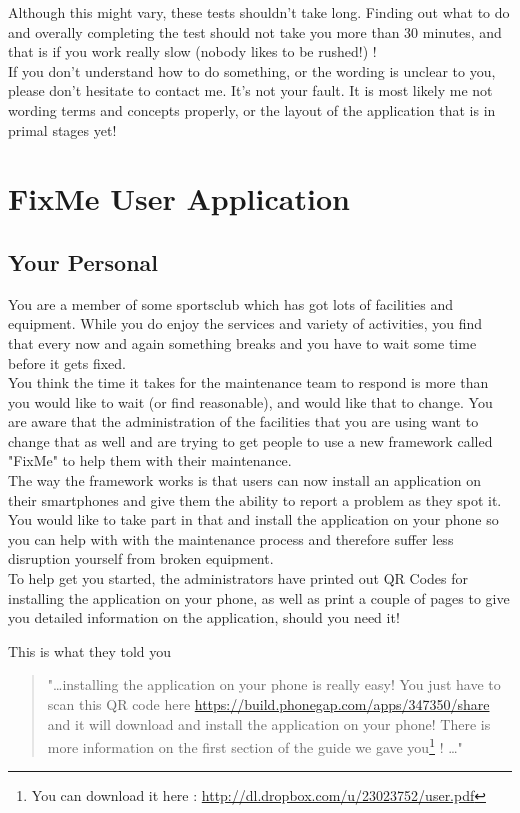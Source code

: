 \documentclass[12pt]{article}
\begin{document}
Although this might vary, these tests shouldn't take long. Finding out what to do and overally completing the test should not take you more than 30 minutes, and that is if you work really slow (nobody likes to be rushed!) !\\

If you don't understand how to do something, or the wording is unclear to you, please don't hesitate to contact me. It's not your fault. It is most likely me not wording terms and concepts properly, or the layout of the application that is in primal stages yet!

\pagebreak
\section{FixMe User Application}
\subsection{Your Personal}

You are a member of some sportsclub which has got lots of facilities and equipment. While you do enjoy the services and variety of activities, you find that every now and again something breaks and you have to wait some time before it gets fixed. \\

You think the time it takes for the maintenance team to respond is more than you would like to wait (or find reasonable), and would like that to change. You are aware that the administration of the facilities that you are using want to change that as well and are trying to get people to use a new framework called "FixMe" to help them with their maintenance.\\

The way the framework works is that users can now install an application on their smartphones and give them the ability to report a problem as they spot it. You would like to take part in that and install the application on your phone so you can help with with the maintenance process and therefore suffer less disruption yourself from broken equipment.\\

To help get you started, the administrators have printed out QR Codes for installing the application on your phone, as well as print a couple of pages to give you detailed information on the application, should you need it!

This is what they told you

\begin{quotation}
"\dots installing the application on your phone is really easy! You just have to scan this QR code here \href{https://build.phonegap.com/apps/347350/share}{https://build.phonegap.com/apps/347350/share} and it will download and install the application on your phone! There is more information on the first section of the guide we gave you\footnote{You can download it here : \href{http://dl.dropbox.com/u/23023752/user.pdf}{http://dl.dropbox.com/u/23023752/user.pdf}} ! \dots "
\end{quotation}
\end{document}
